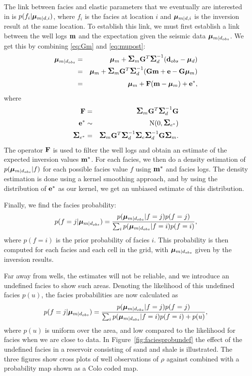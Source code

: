 The link between facies and elastic parameters that we eventually are
interested in is $p(f_i|\bm\mu_{m|d,i})$, where $f_i$ is the facies at
location $i$ and  $\bm\mu_{m|d,i}$ is the inversion result at the same
location. To establish this link, we must first establish a link
between the well logs $\mathbf{m}$ and the expectation given the seismic
data $\bm\mu_{m|d_{obs}}$. We get this 
by combining \autoref{eq:Gm} and 
\autoref{eq:mupost}: 
\begin{eqnarray}
\bm\mu_{m|d_{obs}} &=&\bm\mu_{m} +\mbox{\large\ensuremath{\boldsymbol{\Sigma}}}_{m}\mathbf{G}^T \mbox{\large\ensuremath{\boldsymbol{\Sigma}}}_{d}^{-1}
                           (\mathbf{d}_{obs}-\bm\mu_{d}) \nonumber \\
& = & \bm\mu_{m} +\mbox{\large\ensuremath{\boldsymbol{\Sigma}}}_{m}\mathbf{G}^T \mbox{\large\ensuremath{\boldsymbol{\Sigma}}}_{d}^{-1}
                           (\mathbf{G}\mathbf{m}+\mathbf{e}-\mathbf{G}\bm\mu_m) \nonumber\\
& = & \bm\mu_m + \mathbf{F}(\mathbf{m}-\bm\mu_m)+\mathbf{e}^*,
\end{eqnarray}
where
\begin{eqnarray}
\mathbf{F} & = &\mbox{\large\ensuremath{\boldsymbol{\Sigma}}}_{m}\mathbf{G}^T \mbox{\large\ensuremath{\boldsymbol{\Sigma}}}_{d}^{-1}\mathbf{G} \\
\mathbf{e}^* & \sim & \text{N}(0,\mbox{\large\ensuremath{\boldsymbol{\Sigma}}}_{e^*}) \\
\mbox{\large\ensuremath{\boldsymbol{\Sigma}}}_{e^*} & = & \mbox{\large\ensuremath{\boldsymbol{\Sigma}}}_{m}\mathbf{G}^T \mbox{\large\ensuremath{\boldsymbol{\Sigma}}}_{d}^{-1}\mbox{\large\ensuremath{\boldsymbol{\Sigma}}}_e\mbox{\large\ensuremath{\boldsymbol{\Sigma}}}_{d}^{-1}\mathbf{G}\mbox{\large\ensuremath{\boldsymbol{\Sigma}}}_m.
\end{eqnarray}
The operator $\mathbf{F}$ is used to filter the well logs and obtain an
estimate of the expected inversion values $\mathbf{m}^\ast$. For each
facies, we then do a density estimation of $p(\bm\mu_{m|d_{obs}}|f)$ for
each possible facies value $f$ using $\mathbf{m}^\ast$ and facies
logs. The density estimation is done using a kernel smoothing
approach, and by using the distribution of $\mathbf{e}^*$ as our kernel,
we get an unbiased estimate of this distribution. 

Finally, we find the facies probability:
\begin{equation}
p(f=j|\bm\mu_{m|d_{obs}}) = \frac{p(\bm\mu_{m|d_{obs}}|f=j)p(f=j)}{\sum_i p(\bm\mu_{m|d_{obs}}|f=i)p(f=i)},
\end{equation}
where $p(f=i)$ is the prior probability of facies $i$. This
probability is then computed for each facies and each cell in the
grid, with $\bm\mu_{m|d_{obs}}$ given by the inversion results.

Far away from wells, the estimates will not be reliable, and we
introduce an undefined facies to show such areas. Denoting the
likelihood of this undefined facies $p(u)$, the facies probabilities
are now calculated as
\begin{equation}
p(f=j|\bm\mu_{m|d_{obs}}) = \frac{p(\bm\mu_{m|d_{obs}}|f=j)p(f=j)}{\sum_i p(\bm\mu_{m|d_{obs}}|f=i)p(f=i)+p(u)},
\end{equation}
where $p(u)$ is uniform over the area, and low compared to the
likelihood for facies when we are close to data. In
Figure~\ref{fig:faciesprobundef} the effect of the undefined facies in
a reservoir consisting of sand and shale is illustrated. The three
figures show cross plots of well observations of $\rho$ against \vp
combined with a probability map shown as a Colo coded map. 

